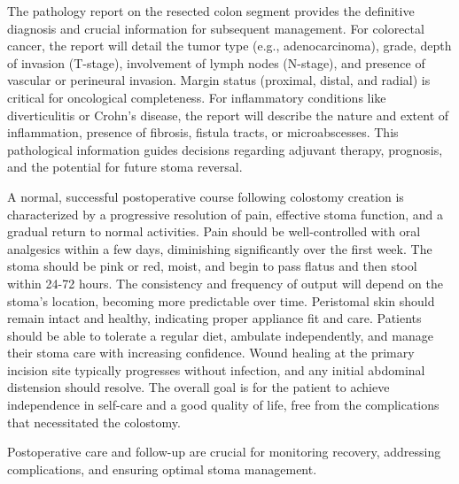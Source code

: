 The pathology report on the resected colon segment provides the definitive diagnosis and crucial information for subsequent management. For colorectal cancer, the report will detail the tumor type (e.g., adenocarcinoma), grade, depth of invasion (T-stage), involvement of lymph nodes (N-stage), and presence of vascular or perineural invasion. Margin status (proximal, distal, and radial) is critical for oncological completeness. For inflammatory conditions like diverticulitis or Crohn's disease, the report will describe the nature and extent of inflammation, presence of fibrosis, fistula tracts, or microabscesses. This pathological information guides decisions regarding adjuvant therapy, prognosis, and the potential for future stoma reversal.

A normal, successful postoperative course following colostomy creation is characterized by a progressive resolution of pain, effective stoma function, and a gradual return to normal activities. Pain should be well-controlled with oral analgesics within a few days, diminishing significantly over the first week. The stoma should be pink or red, moist, and begin to pass flatus and then stool within 24-72 hours. The consistency and frequency of output will depend on the stoma's location, becoming more predictable over time. Peristomal skin should remain intact and healthy, indicating proper appliance fit and care. Patients should be able to tolerate a regular diet, ambulate independently, and manage their stoma care with increasing confidence. Wound healing at the primary incision site typically progresses without infection, and any initial abdominal distension should resolve. The overall goal is for the patient to achieve independence in self-care and a good quality of life, free from the complications that necessitated the colostomy.

Postoperative care and follow-up are crucial for monitoring recovery, addressing complications, and ensuring optimal stoma management.

